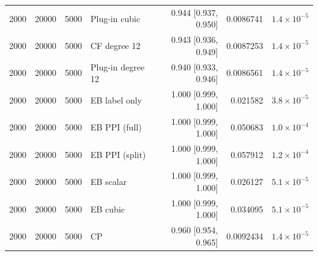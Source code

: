 {\begin{longtable}{rrrlrrr}
2000 & 20000 & 5000 & Plug-in cubic & 0.944 [0.937, 0.950] & 0.0086741 & $1.4\times 10^{-5}$ \\
2000 & 20000 & 5000 & CF degree 12 & 0.943 [0.936, 0.949] & 0.0087253 & $1.4\times 10^{-5}$ \\
2000 & 20000 & 5000 & Plug-in degree 12 & 0.940 [0.933, 0.946] & 0.0086561 & $1.4\times 10^{-5}$ \\
2000 & 20000 & 5000 & EB label only & 1.000 [0.999, 1.000] & 0.021582 & $3.8\times 10^{-5}$ \\
2000 & 20000 & 5000 & EB PPI (full) & 1.000 [0.999, 1.000] & 0.050683 & $1.0\times 10^{-4}$ \\
2000 & 20000 & 5000 & EB PPI (split) & 1.000 [0.999, 1.000] & 0.057912 & $1.2\times 10^{-4}$ \\
2000 & 20000 & 5000 & EB scalar & 1.000 [0.999, 1.000] & 0.026127 & $5.1\times 10^{-5}$ \\
2000 & 20000 & 5000 & EB cubic & 1.000 [0.999, 1.000] & 0.034095 & $5.1\times 10^{-5}$ \\
2000 & 20000 & 5000 & CP & 0.960 [0.954, 0.965] & 0.0092434 & $1.4\times 10^{-5}$ \\
\end{longtable}}
